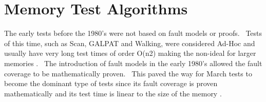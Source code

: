 \section{Memory Test Algorithms}
\label{sect:bg-algorithms}
The early tests before the 1980’s were not based on fault models or proofs.  Tests of this time, such as Scan, GALPAT and Walking, were considered Ad-Hoc and usually have very long test times of order O(n2) making the non-ideal for larger memories \cite{1327984}.  The introduction of fault models in the early 1980’s allowed the fault coverage to be mathematically proven.  This paved the way for March tests to become the dominant type of tests since its fault coverage is proven mathematically and its test time is linear to the size of the memory \cite{1327984}.  









